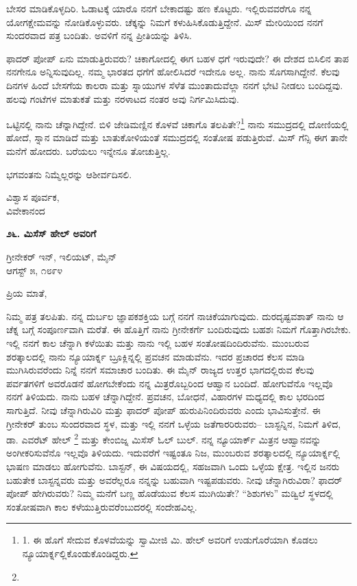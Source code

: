 ಬೇಸರ ಮಾಡಿಕೊಳ್ಳದಿರಿ. ಓಡಾಟಕ್ಕೆ ಯಾರೊ ನನಗೆ ಬೇಕಾದಷ್ಟು ಹಣ ಕೊಟ್ಟರು. ಇಲ್ಲಿರುವವರೆಗೂ ನನ್ನ ಯೋಗಕ್ಷೇಮವನ್ನು ನೋಡಿಕೊಳ್ಳುವರು. ಚೆಕ್ಕನ್ನು ನಿಮಗೆ ಕಳುಹಿಸಿಕೊಡುತ್ತಿದ್ದೇನೆ. ಮಿಸ್ ಮೇರಿಯಿಂದ ನನಗೆ ಸುಂದರವಾದ ಪತ್ರ ಬಂದಿತು. ಅವಳಿಗೆ ನನ್ನ ಪ್ರೀತಿಯನ್ನು ತಿಳಿಸಿ.

ಫಾದರ್ ಪೋಪ್ ಏನು ಮಾಡುತ್ತಿರುವರು? ಚಿಕಾಗೋದಲ್ಲಿ ಈಗ ಬಹಳ ಧಗೆ ಇರುವುದೇ? ಈ ದೇಶದ ಬಿಸಿಲಿನ ತಾಪ ನನಗೇನೂ ಅನ್ನಿಸುವುದಿಲ್ಲ. ನಮ್ಮ ಭಾರತದ ಧಗೆಗೆ ಹೋಲಿಸಿದರೆ ಇದೇನೂ ಅಲ್ಲ. ನಾನು ಸೊಗಸಾಗಿದ್ದೇನೆ. ಕೆಲವು ದಿನಗಳ ಹಿಂದೆ ಬೇಸಗೆಯ ಕಾಲರಾ ಮತ್ತು ಸ್ನಾಯುಗಳ ಸೆಳೆತ ಮುಂತಾದುವೆಲ್ಲಾ ನನಗೆ ಭೇಟಿ ನೀಡಲು ಬಂದಿದ್ದವು. ಹಲವು ಗಂಟೆಗಳ ಮಾತುಕತೆ ಮತ್ತು ನರಳಾಟದ ನಂತರ ಅವು ನಿರ್ಗಮಿಸಿದುವು.

ಒಟ್ಟಿನಲ್ಲಿ ನಾನು ಚೆನ್ನಾಗಿದ್ದೇನೆ. ಬಿಳಿ ಜೇಡಿಮಣ್ಣಿನ ಕೊಳವೆ ಚಿಕಾಗೊ ತಲಪಿತೇ?\footnote{1. ಈ ಹೊಗೆ ಸೇದುವ ಕೊಳವೆಯನ್ನು ಸ್ವಾಮೀಜಿ ಮಿ. ಹೇಲ್ ಅವರಿಗೆ ಉಡುಗೊರೆಯಾಗಿ ಕೊಡಲು ನ್ಯೂಯಾರ್ಕ್ನಲ್ಲಿಕೊಂಡುಕೊಂಡಿದ್ದರು.} ನಾನು ಸಮುದ್ರದಲ್ಲಿ ದೋಣಿಯಲ್ಲಿ ಹೋದೆ, ಸ್ನಾನ ಮಾಡಿದೆ ಮತ್ತು ಬಾತುಕೋಳಿಯಂತೆ ಸಮುದ್ರದಲ್ಲಿ ಸಂತೋಷ ಪಡುತ್ತಿರುವೆ. ಮಿಸ್ ಗೆನ್ಸಿ ಈಗ ತಾನೇ ಮನೆಗೆ ಹೋದರು. ಬರೆಯಲು ಇನ್ನೇನೂ ತೋಚುತ್ತಿಲ್ಲ.

ಭಗವಂತನು ನಿಮ್ಮೆಲ್ಲರನ್ನು ಆಶೀರ್ವದಿಸಲಿ.

\begin{flushright}
ವಿಶ್ವಾಸ ಪೂರ್ವಕ,\\ವಿವೇಕಾನಂದ
\end{flushright}

\begin{center}
\textbf{೨೬. ಮಿಸೆಸ್ ಹೇಲ್ ಅವರಿಗೆ}
\end{center}

\begin{flushright}
ಗ್ರೀನೇಕರ್ ಇನ್, ಇಲಿಯಟ್, ಮೈನ್\\ಆಗಸ್ಟ್ ೫, ೧೮೯೪
\end{flushright}

ಪ್ರಿಯ ಮಾತೆ,

ನಿಮ್ಮ ಪತ್ರ ತಲಪಿತು. ನನ್ನ ದುರ್ಬಲ ಜ್ಞಾಪಕಶಕ್ತಿಯ ಬಗ್ಗೆ ನನಗೆ ನಾಚಿಕೆಯಾಗುವುದು. ದುರದೃಷ್ಟವಶಾತ್ ನಾನು ಆ ಚೆಕ್ನ ಬಗ್ಗೆ ಸಂಪೂರ್ಣವಾಗಿ ಮರೆತೆ. ಈ ಹೊತ್ತಿಗೆ ನಾನು ಗ್ರೀನೇಕರ್ಗೆ ಬಂದಿರುವುದು ಬಹಶಃ ನಿಮಗೆ ಗೊತ್ತಾಗಿರಬೇಕು. ಇಲ್ಲಿ ನನಗೆ ಕಾಲ ಚೆನ್ನಾಗಿ ಕಳೆಯಿತು ಮತ್ತು ನಾನು ಇಲ್ಲಿ ಬಹಳ ಸಂತೋಷದಿಂದಿರುವೆನು. ಮುಂಬರುವ ಶರತ್ಕಾಲದಲ್ಲಿ ನಾನು ನ್ಯೂಯಾರ್ಕ್ನ ಬ್ರೂಕ್ಲಿನ್ನಲ್ಲಿ ಪ್ರವಚನ ಮಾಡುವೆನು. ಇದರ ಪ್ರಚಾರದ ಕೆಲಸ ಮಾಡಿ ಮುಗಿಸಿರುವರೆಂದು ನಿನ್ನೆ ನನಗೆ ಸಮಾಚಾರ ಬಂದಿತು. ಈ ಮೈನ್ ರಾಜ್ಯದ ಉತ್ತರ ಭಾಗದಲ್ಲಿರುವ ಕೆಲವು ಪರ್ವತಗಳಿಗೆ ಅವರೊಡನೆ ಹೋಗಬೇಕೆಂದು ನನ್ನ ಮಿತ್ರರೊಬ್ಬರಿಂದ ಆಹ್ವಾನ ಬಂದಿದೆ. ಹೋಗುವೆನೊ ಇಲ್ಲವೊ ನನಗೆ ತಿಳಿಯದು. ನಾನು ಬಹಳ ಚೆನ್ನಾಗಿದ್ದೇನೆ. ಪ್ರವಚನ, ಬೋಧನೆ, ವಿಹಾರಗಳ ಮಧ್ಯದಲ್ಲಿ ಕಾಲ ಭರದಿಂದ ಸಾಗುತ್ತಿದೆ. ನೀವು ಚೆನ್ನಾಗಿರುವಿರಿ ಮತ್ತು ಫಾದರ್ ಪೋಪ್ ಹುರುಪಿನಿಂದಿರುವರು ಎಂದು ಭಾವಿಸುತ್ತೇನೆ. ಈ ಗ್ರೀನೇಕರ್ ತುಂಬ ಸುಂದರವಾದ ಸ್ಥಳ, ಮತ್ತು ಇಲ್ಲಿ ನನಗೆ ಒಳ್ಳೆಯ ಜತೆಗಾರರಿರುವರು– ಬಾಸ್ಟನ್ನಿನ, ನಿಮಗೆ ತಿಳಿದ, ಡಾ. ಎವರೆಟ್ ಹೇಲ್ \footnote{} ಮತ್ತು ಕೇಂಬಿಜ್ನ ಮಿಸೆಸ್ ಓಲ್ ಬುಲ್. ನನ್ನ ನ್ಯೂಯಾರ್ಕ್ ಮಿತ್ರನ ಆಹ್ವಾನವನ್ನು ಅಂಗೀಕರಿಸುವೆನೊ ಇಲ್ಲವೊ ತಿಳಿಯದು. ಇದುವರೆಗೆ ಇಷ್ಟಂತೂ ನಿಜ, ಮುಂಬರುವ ಶರತ್ಕಾಲದಲ್ಲಿ ನ್ಯೂಯಾರ್ಕ್ನಲ್ಲಿ ಭಾಷಣ ಮಾಡಲು ಹೋಗುವೆನು. ಬಾಸ್ಟನ್, ಈ ವಿಷಯದಲ್ಲಿ, ಸಹಜವಾಗಿ ಒಂದು ಒಳ್ಳೆಯ ಕ್ಷೇತ್ರ. ಇಲ್ಲಿನ ಜನರು ಬಹುತೇಕ ಬಾಸ್ಟನ್ನವರು ಮತ್ತು ಅವರೆಲ್ಲರೂ ನನ್ನನ್ನು ಬಹುವಾಗಿ ಇಷ್ಟಪಡುವರು. ನೀವು ಚೆನ್ನಾಗಿರುವಿರಾ? ಫಾದರ್ ಪೋಪ್ ಹೇಗಿರುವರು? ನಿಮ್ಮ ಮನೆಗೆ ಬಣ್ಣ ಹೊಡೆಯುವ ಕೆಲಸ ಮುಗಿಯಿತೇ? “ಶಿಶುಗಳು” ಮಡ್ವಿಲೆ ಸ್ಥಳದಲ್ಲಿ ಸಂತೋಷವಾಗಿ ಕಾಲ ಕಳೆಯುತ್ತಿರುವರೆಂಬುದರಲ್ಲಿ ಸಂದೇಹವಿಲ್ಲ.

